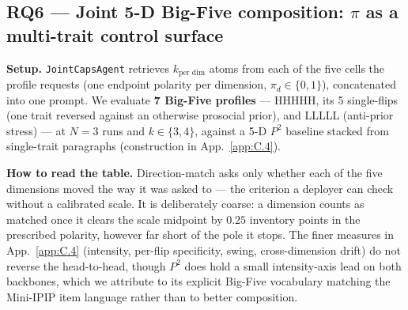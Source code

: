 \subsection{RQ6 --- Joint 5-D Big-Five composition: $\pi$ as a multi-trait control surface}
\label{sec:4.6}

\textbf{Setup.} \texttt{JointCapsAgent} retrieves $k_\text{per dim}$ atoms from each of the five cells the profile requests (one endpoint polarity per dimension, $\pi_d \in \{0,1\}$), concatenated into one prompt. We evaluate \textbf{7 Big-Five profiles} --- HHHHH, its 5 single-flips (one trait reversed against an otherwise prosocial prior), and LLLLL (anti-prior stress) --- at $N{=}3$ runs and $k{\in}\{3, 4\}$, against a 5-D $P^{\!2}$ baseline stacked from \citet{NPTI} single-trait paragraphs (construction in App.~\ref{app:C.4}).

\textbf{How to read the table.} Direction-match asks only whether each of the five dimensions moved the way it was asked to --- the criterion a deployer can check without a calibrated scale. It is deliberately coarse: a dimension counts as matched once it clears the scale midpoint by $0.25$ inventory points in the prescribed polarity, however far short of the pole it stops. The finer measures in App.~\ref{app:C.4} (intensity, per-flip specificity, swing, cross-dimension drift) do not reverse the head-to-head, though $P^{\!2}$ does hold a small intensity-axis lead on both backbones, which we attribute to its explicit Big-Five vocabulary matching the Mini-IPIP item language rather than to better composition.

\begin{table}[t]
\centering
{}
\caption{Joint 5-D Big-Five composition head-to-head on two commercial backbones (MM, Gem) at $k_\text{per dim}{=}4$. Direction-match rate over 7 profiles $\times$ $N{=}3$ runs; \texttt{excl. LLLLL} removes the anti-prior all-low profile; \texttt{LLLLL} is the anti-prior cell only. Full grid (k=3 and k=4, per-profile, intensity, specificity) in Table~\ref{tab:p2-joint-5d-headtohead} (App. \ref{app:C.4}).}
\label{tab:rq6-joint-headtohead}
\end{table}

